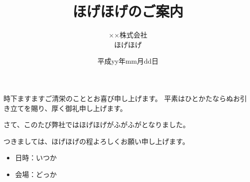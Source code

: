 \documentclass[uplatex,a4j,fleqn,12pt]{jsarticle}
\date{平成yy年mm月dd日}
\author{××株式会社\\ほげほげ\\}
\title{ほげほげのご案内}
\begin{document}
\maketitle

\begin{haikei}
時下ますますご清栄のこととお喜び申し上げます。
平素はひとかたならぬお引き立てを賜り、厚く御礼申し上げます。

さて、このたび弊社ではほげほげがふがふがとなりました。

つきましては、ほげほげの程よろしくお願い申し上げます。
\end{haikei}

\begin{kigaki}
\begin{itemize}
    \item 日時：いつか
    \item 会場：どっか
\end{itemize}
\end{kigaki}
\end{document}
